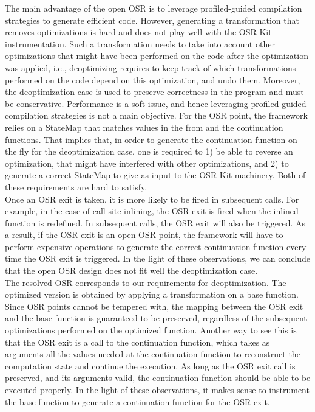 The main advantage of the open OSR is to leverage profiled-guided compilation strategies to generate efficient code.
However, generating a transformation that removes optimizations is hard and does not play well with the OSR Kit instrumentation.
Such a transformation needs to take into account other optimizations that might have been performed on the code after the optimization was applied, i.e., deoptimizing requires to keep track of which transformations performed on the code depend on this optimization, and undo them.
Moreover, the deoptimization case is used to preserve correctness in the program and must be conservative. 
Performance is a soft issue, and hence leveraging profiled-guided compilation strategies is not a main objective. 
For the OSR point, the framework relies on a StateMap that matches values in the from and the continuation functions.
That implies that, in order to generate the continuation function on the fly for the deoptimization case, one is required to 1) be able to reverse an optimization, that might have interfered with other optimizations, and 2) to generate a correct StateMap to give as input to the OSR Kit machinery.
Both of these requirements are hard to satisfy.\\

Once an OSR exit is taken, it is more likely to be fired in subsequent calls.
For example, in the case of call site inlining, the OSR exit is fired when the inlined function is redefined.
In subsequent calls, the OSR exit will also be triggered.
As a result, if the OSR exit is an open OSR point, the framework will have to perform expensive operations to generate the correct continuation function every time the OSR exit is triggered.
In the light of these observations, we can conclude that the open OSR design does not fit well the deoptimization case.\\

The resolved OSR corresponds to our requirements for deoptimization.
The optimized version is obtained by applying a transformation on a base function.
Since OSR points cannot be tempered with, the mapping between the OSR exit and the base function is guaranteed to be preserved, regardless of the subsequent optimizations performed on the optimized function.
Another way to see this is that the OSR exit is a call to the continuation function, which takes as arguments all the values needed at the continuation function to reconstruct the computation state and continue the execution.
As long as the OSR exit call is preserved, and its arguments valid, the continuation function should be able to be executed properly.
In the light of these observations, it makes sense to instrument the base function to generate a continuation function for the OSR exit.\\

